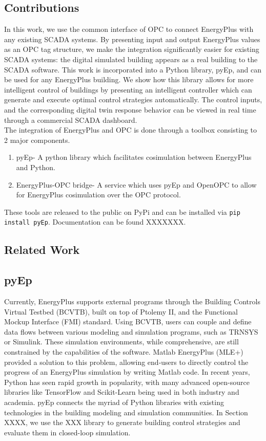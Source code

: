 \subsection{Contributions}
In this work, we use the common interface of OPC to connect EnergyPlus with any existing SCADA systems. By presenting input and output EnergyPlus values as an OPC tag structure, we make the integration significantly easier for existing SCADA systems: the digital simulated building appears as a real building to the SCADA software. This work is incorporated into a Python library, pyEp, and can be used for any EnergyPlus building. We show how this library allows for more intelligent control of buildings by presenting an intelligent controller which can generate and execute optimal control strategies automatically. The control inputs, and the corresponding digital twin response behavior can be viewed in real time through a commercial SCADA dashboard.\\
The integration of EnergyPlus and OPC is done through a toolbox consisting to 2 major components.
\begin{enumerate}
	\item pyEp- A python library which facilitates cosimulation between EnergyPlus and Python. 
	\item EnergyPlus-OPC bridge- A service which uses pyEp and OpenOPC to allow for EnergyPlus cosimulation over the OPC protocol.
\end{enumerate}
These tools are released to the public on PyPi and can be installed via 
\lstinline[language=bash]{pip install pyEp}. Documentation can be found XXXXXXX.

\subsection{Related Work}

\subsection{pyEp}

Currently, EnergyPlus supports external programs through the Building Controls Virtual Testbed (BCVTB), built on top of Ptolemy II, and the Functional Mockup Interface (FMI) standard. Using BCVTB, users can couple and define data flows between various modeling and simulation programs, such as TRNSYS or Simulink. These simulation environments, while comprehensive, are still constrained by the capabilities of the software. Matlab EnergyPlus (MLE+) provided a solution to this problem, allowing end-users to directly control the progress of an EnergyPlus simulation by writing Matlab code. In recent years, Python has seen rapid growth in popularity, with many advanced open-source libraries like TensorFlow and Scikit-Learn being used in both industry and academia. pyEp connects the myriad of Python libraries with existing technologies in the building modeling and simulation communities. In Section XXXX, we use the XXX library to generate building control strategies and evaluate them in closed-loop simulation.

